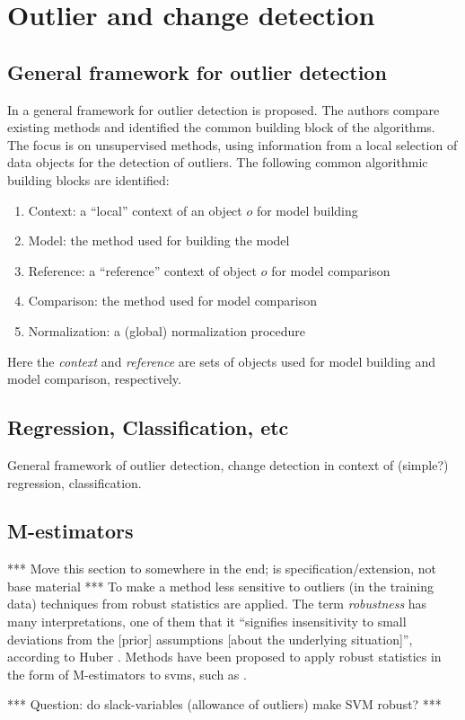 \section{Outlier and change detection}\label{sec:outlier_detection}

\subsection{General framework for outlier detection}
In \cite{schubert2012local} a general framework for outlier detection is proposed.
The authors compare existing methods and identified the common building block of the algorithms.
The focus is on unsupervised methods, using information from a local selection of data objects for the detection of outliers.
The following common algorithmic building blocks are identified:

\begin{enumerate}
  \item Context: a ``local'' context of an object $o$ for model building
  \item Model: the method used for building the model
  \item Reference: a ``reference'' context of object $o$ for model comparison
  \item Comparison: the method used for model comparison
  \item Normalization: a (global) normalization procedure
\end{enumerate}

Here the \emph{context} and \emph{reference} are sets of objects used for model building and model comparison, respectively.


\subsection{Regression, Classification, etc}

General framework of outlier detection, change detection in context of (simple?) regression, classification.

\subsection{M-estimators}
*** Move this section to somewhere in the end; is specification/extension, not base material ***
To make a method less sensitive to outliers (in the training data) techniques from robust statistics are applied.
The term \emph{robustness} has many interpretations, one of them that it ``signifies insensi­tivity to small deviations from the [prior] assumptions [about the underlying situation]'', according to Huber \cite{huber2009robust}.
Methods have been proposed to apply robust statistics in the form of M-estimators to \gls{svm}s, such as \cite{choi2009least,chen2004m,suykens1999least}.

*** Question: do slack-variables (allowance of outliers) make SVM robust? ***